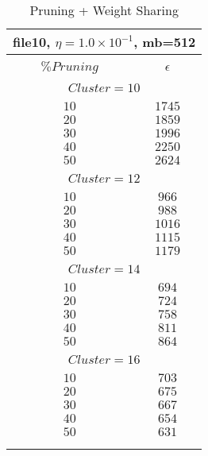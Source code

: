 \documentclass[10pt]{article}
\begin{document}
\begin{table}[]
  \small
  \caption{Pruning + Weight Sharing}\label{tab:tab6}
\begin{center}
\begin{tabular}{cc}
\multicolumn{2}{c}{file10,  $\eta=1.0\times 10^{-1}$, mb=512} \\[5pt]
\hline\\[-11pt]
\texttt{$\% Pruning$} & \texttt{$\epsilon$} \\[5pt]
\hline\\[-11pt]

\multicolumn{2}{c}{$Cluster = 10$} \\[5pt]
\hline\\[-11pt]
$10$ & $1745$ \\ [1pt]
$20$ & $1859$ \\ [1pt]
$30$ & $1996$ \\ [1pt]
$40$ & $2250$ \\ [1pt]
$50$ & $2624$ \\ [1pt]
\hline\\[-11pt]

\multicolumn{2}{c}{$Cluster = 12$} \\[5pt]
\hline\\[-11pt]
$10$ & $966$ \\ [1pt]
$20$ & $988$ \\ [1pt]
$30$ & $1016$ \\[1pt] 
$40$ & $1115$ \\[1pt] 
$50$ & $1179$ \\[1pt]
\hline\\[-11pt]

\multicolumn{2}{c}{$Cluster = 14$} \\[5pt]
\hline\\[-11pt]
$10$ & $694$ \\ [1pt]
$20$ & $724$ \\ [1pt]
$30$ & $758$ \\ [1pt]
$40$ & $811$ \\ [1pt]
$50$ & $864$ \\ [1pt]
\hline\\[-11pt]

\multicolumn{2}{c}{$Cluster = 16$} \\[5pt]
\hline\\[-11pt]
$10$ & $703$ \\ [1pt]
$20$ & $675$ \\ [1pt]
$30$ & $667$ \\ [1pt]
$40$ & $654$ \\ [1pt]
$50$ & $631$ \\ [1pt]
\hline\\[-11pt]

\hline\\[-8pt]
\end{tabular}\\[5pt]
\end{center}
\normalsize
\end{table}	
\end{document}
